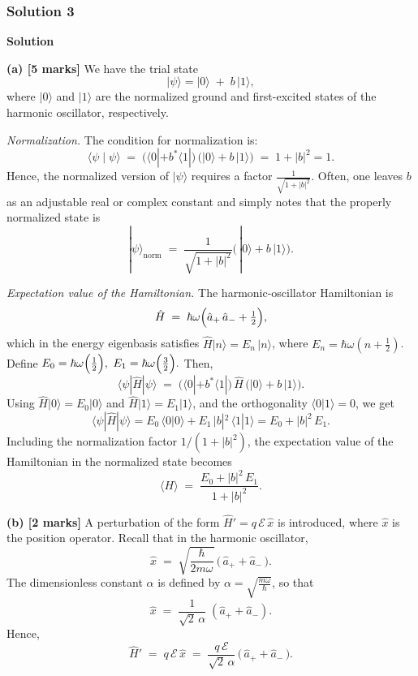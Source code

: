 \documentclass{article}
\begin{document}
\subsubsection{Solution 3}

\textbf{Solution}

\textbf{(a) [5 marks]} 
We have the trial state 
\[
|\psi\rangle = |0\rangle \;+\; b\,|1\rangle,
\]
where \(|0\rangle\) and \(|1\rangle\) are the normalized ground and first-excited states of the harmonic oscillator, respectively. 

\textit{Normalization.} The condition for normalization is:
\[
\langle \psi \mid \psi \rangle \;=\; 
\bigl(\langle 0| + b^*\langle 1|\bigr)\,\bigl(|0\rangle + b\,|1\rangle\bigr) 
\;=\; 1 + |b|^2 = 1.
\]
Hence, the normalized version of \(|\psi\rangle\) requires a factor 
\(\frac{1}{\sqrt{1+|b|^2}}\).
Often, one leaves \(b\) as an adjustable real or complex constant and simply notes 
that the properly normalized state is
\[
|\psi\rangle_{\mathrm{norm}} \;=\; \frac{1}{\sqrt{1 + |b|^2}}\bigl(\,|0\rangle + b\,|1\rangle\bigr).
\]

\textit{Expectation value of the Hamiltonian.} The harmonic-oscillator Hamiltonian is
\[
\hat{H} \;=\; \hbar\omega\Bigl(\hat{a}_+\,\hat{a}_- + \tfrac{1}{2}\Bigr),
\]
which in the energy eigenbasis satisfies \(\hat{H}|n\rangle = E_n\,|n\rangle\), where 
\(E_n = \hbar\omega\left(n + \tfrac{1}{2}\right)\).
Define 
\(
E_0 = \hbar\omega\Bigl(\tfrac{1}{2}\Bigr),
\)
\(
E_1 = \hbar\omega\Bigl(\tfrac{3}{2}\Bigr).
\)
Then,
\[
\langle \psi | \hat{H} | \psi \rangle \;=\; 
\bigl(\langle 0| + b^*\langle 1|\bigr)\,\hat{H}\,\bigl(|0\rangle + b\,|1\rangle\bigr).
\]
Using \(\hat{H}|0\rangle = E_0|0\rangle\) and \(\hat{H}|1\rangle = E_1|1\rangle\), and the orthogonality \(\langle 0|1\rangle=0\), we get
\[
\langle \psi | \hat{H} | \psi \rangle 
= E_0\,\langle 0|0\rangle + E_1\,|b|^2\,\langle 1|1\rangle 
= E_0 + |b|^2\,E_1.
\]
Including the normalization factor \(1/(1 + |b|^2)\), the expectation value of the Hamiltonian in the normalized state becomes
\[
\langle H \rangle \;=\; 
\frac{E_0 + |b|^2\,E_1}{\,1 + |b|^2\,}.
\]

\textbf{(b) [2 marks]} 
A perturbation of the form 
\(
\hat{H}' = q\,\mathcal{E}\,\hat{x}
\)
is introduced, where \(\hat{x}\) is the position operator. Recall that in the harmonic oscillator,
\[
\hat{x}
\;=\;
\sqrt{\frac{\hbar}{2m\omega}}\,\bigl(\,\hat{a}_+ + \hat{a}_-\,\bigr).
\]
The dimensionless constant \(\alpha\) is defined by \(\alpha = \sqrt{\tfrac{m\omega}{\hbar}}\), so that
\[
\hat{x}
\;=\;
\frac{1}{\sqrt{2}\,\alpha}\;(\hat{a}_+ + \hat{a}_-).
\]
Hence,
\[
\hat{H}'
\;=\;
q\,\mathcal{E}\,\hat{x}
\;=\;
\frac{q\,\mathcal{E}}{\sqrt{2}\,\alpha}\,\bigl(\,\hat{a}_+ + \hat{a}_-\,\bigr).
\]
\end{document}

